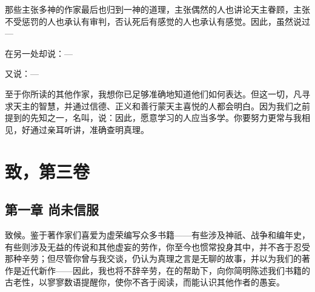 \par

那些主张多神的作家最后也归到一神的道理，主张偶然的人也讲论天主眷顾，主张不受惩罚的人也承认有审判，否认死后有感觉的人也承认有感觉。因此，虽然说过—\par

\par

在另一处却说：—\par

\par

又说：—\par

\par

至于你所读的其他作家，我想你已足够准确地知道他们如何表达。但这一切，凡寻求天主的智慧，并通过信德、正义和善行蒙天主喜悦的人都会明白。因为我们之前提到的先知之一，名叫，说：因此，愿意学习的人应当多学。你要努力更常与我相见，好通过亲耳听讲，准确查明真理。\par



\section{致，第三卷}


\subsection{第一章 尚未信服}

致候。鉴于著作家们喜爱为虚荣编写众多书籍——有些涉及神祇、战争和编年史，有些则涉及无益的传说和其他虚妄的劳作，你至今也惯常投身其中，并不吝于忍受那种辛劳；但尽管你曾与我交谈，仍认为真理之言是无聊的故事，并以为我们的著作是近代新作——因此，我也将不辞辛劳，在的帮助下，向你简明陈述我们书籍的古老性，以寥寥数语提醒你，使你不吝于阅读，而能认识其他作者的愚妄。\par

